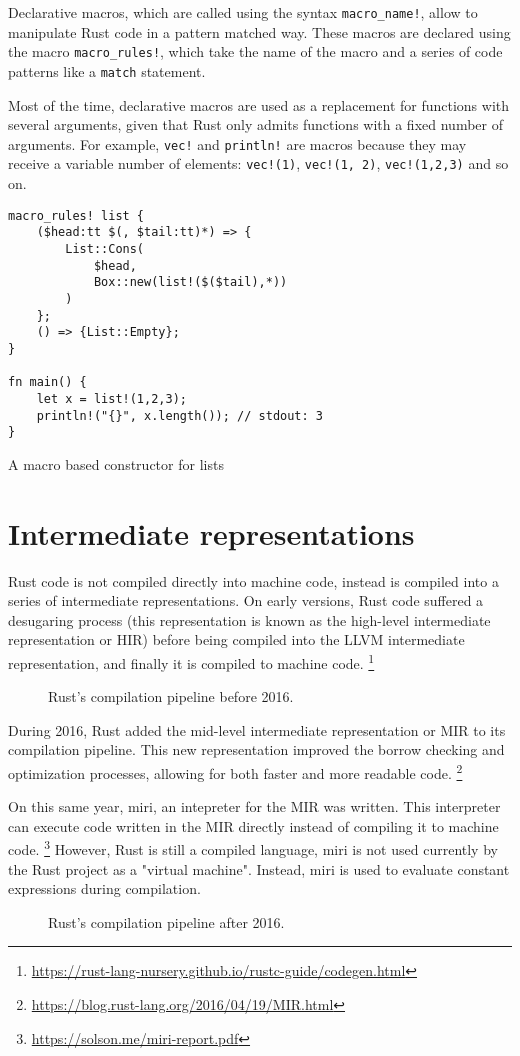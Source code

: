 Declarative macros, which are called using the syntax \texttt{macro\_name!}, allow to manipulate Rust code in a pattern matched way. These macros are declared using the macro \texttt{macro\_rules!}, which take the name of the macro and a series of code patterns like a \texttt{match} statement. 

Most of the time, declarative macros are used as a replacement for functions with several arguments, given that Rust only admits functions with a fixed number of arguments. For example, \texttt{vec!} and \texttt{println!} are macros because they may receive a variable number of elements: \texttt{vec!(1)},  \texttt{vec!(1, 2)},  \texttt{vec!(1,2,3)} and so on.


\begin{listing}[ht]
	\begin{verbatim}
macro_rules! list {
    ($head:tt $(, $tail:tt)*) => {
        List::Cons(
            $head, 
            Box::new(list!($($tail),*))
        )
    };
    () => {List::Empty};
}

fn main() {
    let x = list!(1,2,3);
    println!("{}", x.length()); // stdout: 3
}
    \end{verbatim}
  \caption{A macro based constructor for lists}
  \label{lst:unrecoverable_error}
\end{listing}
\section{Intermediate representations}
Rust code is not compiled directly into machine code, instead is compiled into a series of intermediate representations. On early versions, Rust code suffered a desugaring process (this representation is known as the high-level intermediate representation or HIR) before being compiled into the LLVM intermediate representation, and finally it is compiled to machine code. \footnote{\url{https://rust-lang-nursery.github.io/rustc-guide/codegen.html}}

\begin{figure}[ht]
  \centering
  \caption{Rust's compilation pipeline before 2016.}
\end{figure}

During 2016, Rust added the mid-level intermediate representation or MIR to its compilation pipeline. This new representation improved the borrow checking and optimization processes, allowing for both faster and more readable code. \footnote{\url{https://blog.rust-lang.org/2016/04/19/MIR.html}}

On this same year, miri, an intepreter for the MIR was written. This interpreter can execute code written in the MIR directly instead of compiling it to machine code. \footnote{\url{https://solson.me/miri-report.pdf}} However, Rust is still a compiled language, miri is not used currently by the Rust project as a "virtual machine". Instead, miri is used to evaluate constant expressions during compilation.

\begin{figure}[ht]
  \centering
  \caption{Rust's compilation pipeline after 2016.}
\end{figure}
